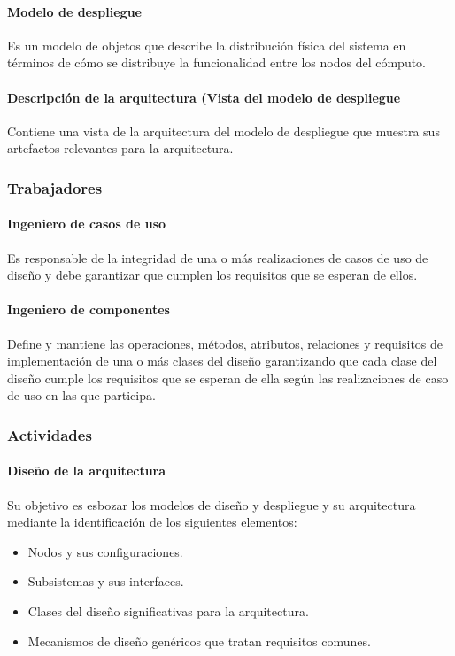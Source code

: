 \paragraph{Modelo de despliegue}
Es un modelo de objetos que describe la distribución física del sistema en términos de cómo se distribuye la funcionalidad entre los nodos del cómputo.
\paragraph{Descripción de la arquitectura (Vista del modelo de despliegue}
Contiene una vista de la arquitectura del modelo de despliegue que muestra sus artefactos relevantes para la arquitectura.
\subsubsection{Trabajadores}
\paragraph{Ingeniero de casos de uso}
Es responsable de la integridad de una o más realizaciones de casos de uso de diseño y debe garantizar que cumplen los requisitos que se esperan de ellos.
\paragraph{Ingeniero de componentes}
Define y mantiene las operaciones, métodos, atributos, relaciones y requisitos de implementación de una o más clases del diseño garantizando que cada clase del diseño cumple los requisitos que se esperan de ella según las realizaciones de caso de uso en las que participa.
\subsubsection{Actividades}
\paragraph{Diseño de la arquitectura}
Su objetivo es esbozar los modelos de diseño y despliegue y su arquitectura mediante la identificación de los siguientes elementos:
\begin{itemize}
	\item Nodos y sus configuraciones.
	\item Subsistemas y sus interfaces.
	\item Clases del diseño significativas para la arquitectura.
	\item Mecanismos de diseño genéricos que tratan requisitos comunes.
\end{itemize}
